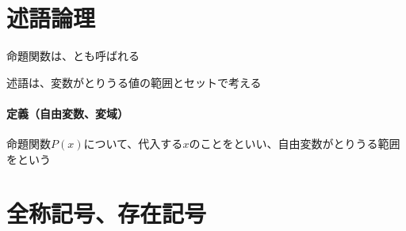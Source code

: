 \documentclass[../book_need-set-theory]{subfiles}
\begin{document}
\section{述語論理}

命題関数は、とも呼ばれる

述語は、変数がとりうる値の範囲とセットで考える

\begin{oframed}
  \paragraph{定義（自由変数、変域）}
  命題関数$P(x)$について、代入する$x$のことをといい、自由変数がとりうる範囲をという
\end{oframed}

\section{全称記号、存在記号}
\end{document}
